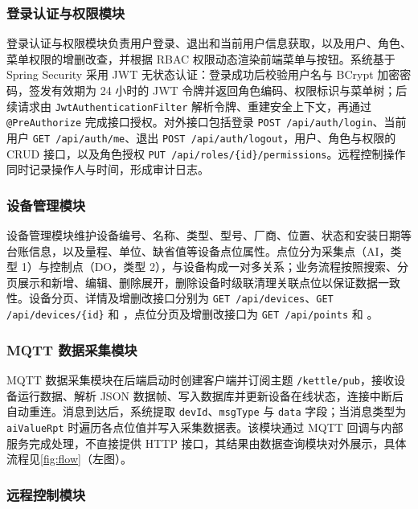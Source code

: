 \documentclass[12pt,hyperref,a4paper,UTF8]{ctexart}
\begin{document}
\subsubsection{登录认证与权限模块}

登录认证与权限模块负责用户登录、退出和当前用户信息获取，以及用户、角色、菜单权限的增删改查，并根据 RBAC 权限动态渲染前端菜单与按钮。系统基于 Spring Security 采用 JWT 无状态认证：登录成功后校验用户名与 BCrypt 加密密码，签发有效期为 24 小时的 JWT 令牌并返回角色编码、权限标识与菜单树；后续请求由 \texttt{JwtAuthenticationFilter} 解析令牌、重建安全上下文，再通过 \texttt{@PreAuthorize} 完成接口授权。对外接口包括登录 \texttt{POST /api/auth/login}、当前用户 \texttt{GET /api/auth/me}、退出 \texttt{POST /api/auth/logout}，用户、角色与权限的 CRUD 接口，以及角色授权 \texttt{PUT /api/roles/\{id\}/permissions}。远程控制操作同时记录操作人与时间，形成审计日志。

\subsubsection{设备管理模块}

设备管理模块维护设备编号、名称、类型、型号、厂商、位置、状态和安装日期等台账信息，以及量程、单位、缺省值等设备点位属性。点位分为采集点（AI，类型 1）与控制点（DO，类型 2），与设备构成一对多关系；业务流程按照搜索、分页展示和新增、编辑、删除展开，删除设备时级联清理关联点位以保证数据一致性。设备分页、详情及增删改接口分别为 \texttt{GET /api/devices}、\texttt{GET /api/devices/\{id\}} 和 ，点位分页及增删改接口为 \texttt{GET /api/points} 和 。

\subsubsection{MQTT 数据采集模块}

MQTT 数据采集模块在后端启动时创建客户端并订阅主题 \texttt{/kettle/pub}，接收设备运行数据、解析 JSON 数据帧、写入数据库并更新设备在线状态，连接中断后自动重连。消息到达后，系统提取 \texttt{devId}、\texttt{msgType} 与 \texttt{data} 字段；当消息类型为 \texttt{aiValueRpt} 时遍历各点位值并写入采集数据表。该模块通过 MQTT 回调与内部服务完成处理，不直接提供 HTTP 接口，其结果由数据查询模块对外展示，具体流程见\autoref{fig:flow}（左图）。

\subsubsection{远程控制模块}
\end{document}
